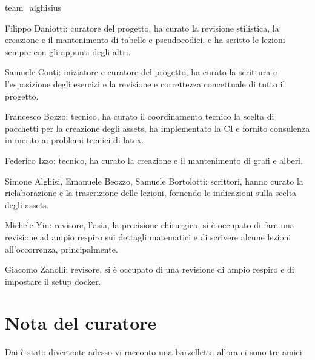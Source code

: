 \documentclass[class=book, crop=false, oneside, 12pt]{standalone}
\begin{document}
\begin{labeling}{team\_alghisius}
    \item[p1ps] Filippo Daniotti: curatore del progetto, ha curato la revisione stilistica, la creazione e il mantenimento di tabelle e pseudocodici, e ha scritto le lezioni sempre con gli appunti degli altri.
    \item[sam4retas] Samuele Conti: iniziatore e curatore del progetto, ha curato la scrittura e l'esposizione degli esercizi e la revisione e correttezza concettuale di tutto il progetto.
    \item[frab0zzo] Francesco Bozzo: tecnico, ha curato il coordinamento tecnico la scelta di pacchetti per la creazione degli assets, ha implementato la CI e fornito consulenza in merito ai problemi tecnici di latex.
    \item[f1zzo] Federico Izzo: tecnico, ha curato la creazione e il mantenimento di grafi e alberi.
    \item[team\_alghisius] Simone Alghisi, Emanuele Beozzo, Samuele Bortolotti: scrittori, hanno curato la rielaborazione e la trascrizione delle lezioni, fornendo le indicazioni sulla scelta degli assets.
    \item[ch!n4] Michele Yin: revisore, l'asia, la precisione chirurgica, si è occupato di fare una revisione ad ampio respiro sui dettagli matematici e di scrivere alcune lezioni all'occorrenza, principalmente.
    \item[j4bb] Giacomo Zanolli: revisore, si è occupato di una revisione di ampio respiro e di impostare il setup docker. 
\end{labeling}  

\section*{Nota del curatore}
Dai è stato divertente adesso vi racconto una barzelletta allora ci sono tre amici
\end{document}
